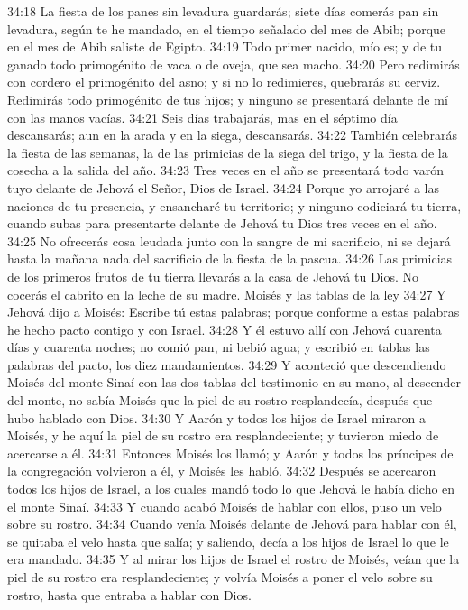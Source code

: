 34:18 La fiesta de los panes sin levadura guardarás; siete días comerás pan sin levadura, según te he mandado, en el tiempo señalado del mes de Abib; porque en el mes de Abib saliste de Egipto. 
34:19 Todo primer nacido, mío es; y de tu ganado todo primogénito de vaca o de oveja, que sea macho. 
34:20 Pero redimirás con cordero el primogénito del asno; y si no lo redimieres, quebrarás su cerviz. Redimirás todo primogénito de tus hijos; y ninguno se presentará delante de mí con las manos vacías. 
34:21 Seis días trabajarás, mas en el séptimo día descansarás; aun en la arada y en la siega, descansarás. 
34:22 También celebrarás la fiesta de las semanas, la de las primicias de la siega del trigo, y la fiesta de la cosecha a la salida del año. 
34:23 Tres veces en el año se presentará todo varón tuyo delante de Jehová el Señor, Dios de Israel. 
34:24 Porque yo arrojaré a las naciones de tu presencia, y ensancharé tu territorio; y ninguno codiciará tu tierra, cuando subas para presentarte delante de Jehová tu Dios tres veces en el año. 
34:25 No ofrecerás cosa leudada junto con la sangre de mi sacrificio, ni se dejará hasta la mañana nada del sacrificio de la fiesta de la pascua. 
34:26 Las primicias de los primeros frutos de tu tierra llevarás a la casa de Jehová tu Dios. No cocerás el cabrito en la leche de su madre. 
Moisés y las tablas de la ley 
34:27 Y Jehová dijo a Moisés: Escribe tú estas palabras; porque conforme a estas palabras he hecho pacto contigo y con Israel. 
34:28 Y él estuvo allí con Jehová cuarenta días y cuarenta noches; no comió pan, ni bebió agua; y escribió en tablas las palabras del pacto, los diez mandamientos. 
34:29 Y aconteció que descendiendo Moisés del monte Sinaí con las dos tablas del testimonio en su mano, al descender del monte, no sabía Moisés que la piel de su rostro resplandecía, después que hubo hablado con Dios. 
34:30 Y Aarón y todos los hijos de Israel miraron a Moisés, y he aquí la piel de su rostro era resplandeciente; y tuvieron miedo de acercarse a él. 
34:31 Entonces Moisés los llamó; y Aarón y todos los príncipes de la congregación volvieron a él, y Moisés les habló. 
34:32 Después se acercaron todos los hijos de Israel, a los cuales mandó todo lo que Jehová le había dicho en el monte Sinaí. 
34:33 Y cuando acabó Moisés de hablar con ellos, puso un velo sobre su rostro. 
34:34 Cuando venía Moisés delante de Jehová para hablar con él, se quitaba el velo hasta que salía; y saliendo, decía a los hijos de Israel lo que le era mandado. 
34:35 Y al mirar los hijos de Israel el rostro de Moisés, veían que la piel de su rostro era resplandeciente; y volvía Moisés a poner el velo sobre su rostro, hasta que entraba a hablar con Dios. 
